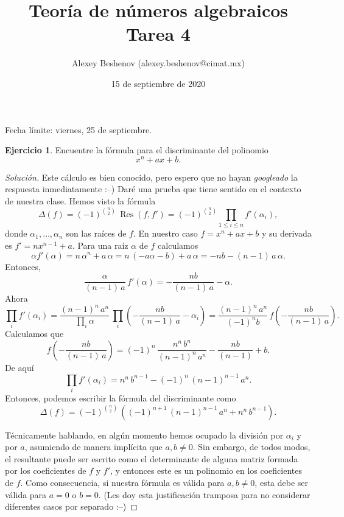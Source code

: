 \documentclass{article}
\title{Teoría de números algebraicos\\Tarea 4}
\author{Alexey Beshenov (alexey.beshenov@cimat.mx)}
\date{15 de septiembre de 2020}
\newcounter{tarea}
\theoremstyle{definition}
\newtheorem{ejercicio}{Ejercicio}[tarea]
\newenvironment{solucion}{\begin{proof}[Solución]}{\end{proof}}
\DeclareMathOperator{\Res}{Res}
\begin{document}
{\sffamily\bfseries\maketitle}

\noindent Fecha límite: viernes, 25 de septiembre.

\ifdefined\solutions
\else
\thispagestyle{empty}
\fi

\vspace{1em}

\begin{ejercicio}
  Encuentre la fórmula para el discriminante del polinomio
  $$x^n + ax + b.$$

  \ifdefined\solutions
  \begin{solucion}
    Este cálculo es bien conocido, pero espero que no hayan \emph{googleado}
    la respuesta inmediatamente :--) Daré una prueba que tiene sentido en
    el contexto de nuestra clase. Hemos visto la fórmula
    \[ \Delta (f) = (-1)^{n\choose 2}\,\Res (f,f')
                  = (-1)^{n \choose 2} \prod_{1 \le i \le n} f' (\alpha_i), \]
    donde $\alpha_1,\ldots,\alpha_n$ son las raíces de $f$.
    En nuestro caso $f = x^n + ax + b$ y su derivada es
    $f' = n x^{n-1} + a$. Para una raíz $\alpha$ de $f$ calculamos
    \[ \alpha f' (\alpha) = n\,\alpha^n + a\,\alpha =
       n\,(-a\alpha - b) + a\,\alpha = -nb - (n-1)\,a\,\alpha. \]
    Entonces,
    $$\frac{\alpha}{(n-1)\,a}\,f' (\alpha) = -\frac{nb}{(n-1)\,a} - \alpha.$$
    Ahora
    \[ \prod_i f' (\alpha_i) =
       \frac{(n-1)^n\,a^n}{\prod_i \alpha} \, \prod_i \left(-\frac{nb}{(n-1)\,a} - \alpha_i\right)
       = \frac{(n-1)^n\,a^n}{(-1)^n b}\,f\left(-\frac{nb}{(n-1)\,a}\right). \]
    Calculamos que
    \[ f\left(-\frac{nb}{(n-1)\,a}\right) =
       (-1)^n\,\frac{n^n\,b^n}{(n-1)^n\,a^n} - \frac{nb}{(n-1)} + b. \]
    De aquí
    $$\prod_i f' (\alpha_i) = n^n\,b^{n-1} - (-1)^n\,(n-1)^{n-1}\,a^n.$$
    Entonces, podemos escribir la fórmula del discriminante como
    $$\Delta (f) = (-1)^{n\choose 2}\,((-1)^{n+1}\,(n-1)^{n-1}\,a^n + n^n\,b^{n-1}).$$

    Técnicamente hablando, en algún momento hemos ocupado la división por
    $\alpha_i$ y por $a$, asumiendo de manera implícita que $a,b\ne 0$.
    Sin embargo, de todos modos, el resultante puede ser escrito como
    el determinante de alguna matriz formada por los coeficientes de $f$ y $f'$,
    y entonces este es un polinomio en los coeficientes de $f$. Como
    consecuencia, si nuestra fórmula es válida para $a,b \ne 0$, esta debe ser
    válida para $a = 0$ o $b = 0$. (Les doy esta justificación tramposa para no
    considerar diferentes casos por separado :--)
  \end{solucion}
  \fi
\end{ejercicio}
\end{document}
